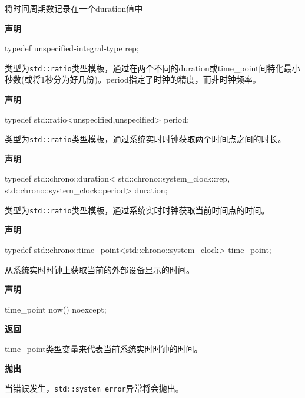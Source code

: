 将时间周期数记录在一个duration值中

\textbf{声明}

\begin{cpp}
typedef unspecified-integral-type rep;
\end{cpp}


类型为\texttt{std::ratio}类型模板，通过在两个不同的duration或time\_point间特化最小秒数(或将1秒分为好几份)。period指定了时钟的精度，而非时钟频率。

\textbf{声明}

\begin{cpp}
typedef std::ratio<unspecified,unspecified> period;
\end{cpp}


类型为\texttt{std::ratio}类型模板，通过系统实时时钟获取两个时间点之间的时长。

\textbf{声明}

\begin{cpp}
typedef std::chrono::duration<
   std::chrono::system_clock::rep,
   std::chrono::system_clock::period> duration;
\end{cpp}


类型为\texttt{std::ratio}类型模板，通过系统实时时钟获取当前时间点的时间。

\textbf{声明}

\begin{cpp}
typedef std::chrono::time_point<std::chrono::system_clock> time_point;
\end{cpp}


从系统实时时钟上获取当前的外部设备显示的时间。

\textbf{声明}

\begin{cpp}
time_point now() noexcept;
\end{cpp}

\textbf{返回}

time\_point类型变量来代表当前系统实时时钟的时间。

\textbf{抛出}

当错误发生，\texttt{std::system\_error}异常将会抛出。


